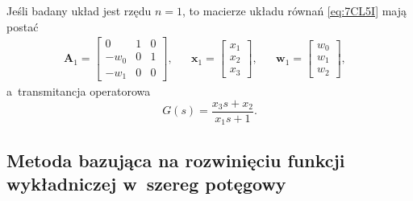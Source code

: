 \documentclass[paper=a4,DIV=12]{lpas}
\begin{document}
\begin{appendices}
  Jeśli badany układ jest rzędu $n=1$, to macierze układu równań
  \eqref{eq:7CL5I} mają postać
  \begin{equation}
    \begin{aligned}
      \mathbf{A}_1 = \begin{bmatrix}
         0    &    1 &    0 \\
         -w_0 &    0 &    1 \\
         -w_1 &    0 &    0
      \end{bmatrix}, &
      & \mathbf{x}_1 = \begin{bmatrix}
        x_1 \\ x_2 \\ x_3
      \end{bmatrix}, &
      & \mathbf{w}_1 = \begin{bmatrix}
        w_0 \\ w_1 \\  w_2
      \end{bmatrix}, &
    \end{aligned}
  \end{equation}
  a~transmitancja operatorowa
  \begin{equation}
    G(s) = \frac{x_3 s + x_2}{x_1 s + 1}.
  \end{equation}

  \subsection{Metoda bazująca na rozwinięciu funkcji wykładniczej w~szereg potęgowy}
  \label{eq:Q1UWQ}


\end{appendices}
\end{document}
